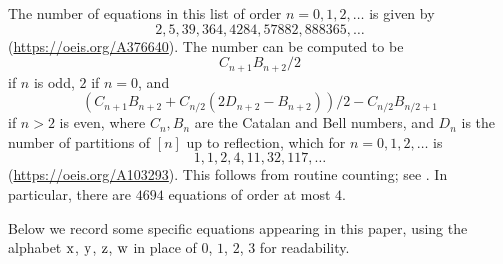 The number of equations in this list of order $n=0,1,2,\dots$ is given by
$$ 2, 5, 39, 364, 4284, 57882, 888365, \dots$$
(\url{https://oeis.org/A376640}).  The number can be computed to be
$$ C_{n+1} B_{n+2}/2$$
if $n$ is odd, $2$ if $n=0$, and
$$ (C_{n+1} B_{n+2}+ C_{n/2}(2D_{n+2}-B_{n+2}))/2 - C_{n/2} B_{n/2+1}$$
if $n > 2$ is even, where $C_n, B_n$ are the Catalan and Bell numbers, and $D_n$ is the number of partitions of $[n]$ up to reflection, which for $n=0,1,2,\dots$ is
$$ 1, 1, 2, 4, 11, 32, 117, \dots$$
(\url{https://oeis.org/A103293}).  This follows from routine counting; see \cite[Lemma~1.14]{ETP_blueprint}.  In particular, there are $4694$ equations of order at most $4$.

Below we record some specific equations appearing in this paper, using the alphabet $\mathrm{x}$, $\mathrm{y}$, $\mathrm{z}$, $\mathrm{w}$ in place of $0$, $1$, $2$, $3$ for readability.
\begingroup\allowdisplaybreaks
